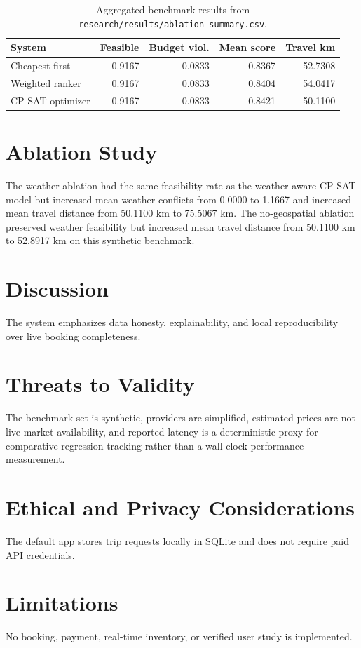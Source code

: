 \documentclass[11pt]{article}
\begin{document}
\begin{table}[h]
\centering
\begin{tabular}{lrrrr}
\toprule
System & Feasible & Budget viol. & Mean score & Travel km \\
\midrule
Cheapest-first & 0.9167 & 0.0833 & 0.8367 & 52.7308 \\
Weighted ranker & 0.9167 & 0.0833 & 0.8404 & 54.0417 \\
CP-SAT optimizer & 0.9167 & 0.0833 & 0.8421 & 50.1100 \\
\bottomrule
\end{tabular}
\caption{Aggregated benchmark results from \texttt{research/results/ablation\_summary.csv}.}
\label{tab:results}
\end{table}

\section{Ablation Study}
The weather ablation had the same feasibility rate as the weather-aware CP-SAT model but increased mean weather
conflicts from 0.0000 to 1.1667 and increased mean travel distance from 50.1100 km to 75.5067 km. The no-geospatial
ablation preserved weather feasibility but increased mean travel distance from 50.1100 km to 52.8917 km on this
synthetic benchmark.

\section{Discussion}
The system emphasizes data honesty, explainability, and local reproducibility over live booking completeness.

\section{Threats to Validity}
The benchmark set is synthetic, providers are simplified, estimated prices are not live market availability, and
reported latency is a deterministic proxy for comparative regression tracking rather than a wall-clock performance
measurement.

\section{Ethical and Privacy Considerations}
The default app stores trip requests locally in SQLite and does not require paid API credentials.

\section{Limitations}
No booking, payment, real-time inventory, or verified user study is implemented.
\end{document}
